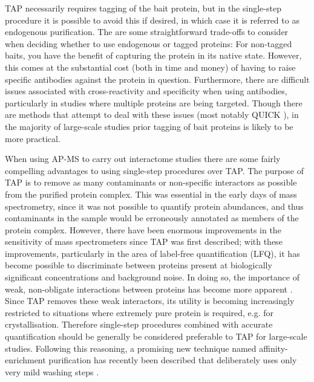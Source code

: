 \documentclass[a4paper,11pt,twoside,openright]{scrbook}
\begin{document}
TAP necessarily requires tagging of the bait protein, but in the single-step
procedure it is possible to avoid this if desired, in which case it is referred
to as endogenous purification. The are some straightforward trade-offs to
consider when deciding whether to use endogenous or tagged proteins: For
non-tagged baits, you have the benefit of capturing the protein in its native
state. However, this comes at the substantial cost (both in time and money) of
having to raise specific antibodies against the protein in question.
Furthermore, there are difficult issues associated with cross-reactivity and
specificity when using antibodies, particularly in studies where multiple
proteins are being targeted. Though there are methods that attempt to deal with
these issues (most notably QUICK \cite{Selbach2006}), in the majority of
large-scale studies prior tagging of bait proteins is likely to be more
practical.

When using AP-MS to carry out interactome studies there are some fairly
compelling advantages to using single-step procedures over TAP. The purpose of
TAP is to remove as many contaminants or non-specific interactors as possible
from the purified protein complex. This was essential in the early days of mass
spectrometry, since it was not possible to quantify protein abundances, and thus
contaminants in the sample would be erroneously annotated as members of the
protein complex. However, there have been enormous improvements in the
sensitivity of mass spectrometers since TAP was first described; with these
improvements, particularly in the area of label-free quantification (LFQ), it
has become possible to discriminate between proteins present at biologically
significant concentrations and background noise. In doing so, the importance of
weak, non-obligate interactions between proteins has become more apparent
\cite{Perkins2010a,Hein2015}. Since TAP removes these weak interactors, its
utility is becoming increasingly restricted to situations where extremely pure
protein is required, e.g. for crystallisation. Therefore single-step procedures
combined with accurate quantification should be generally be considered
preferable to TAP for large-scale studies. Following this reasoning, a promising
new technique named affinity-enrichment purification has recently been described
that deliberately uses only very mild washing steps \cite{Keilhauer2015}.
\end{document}
